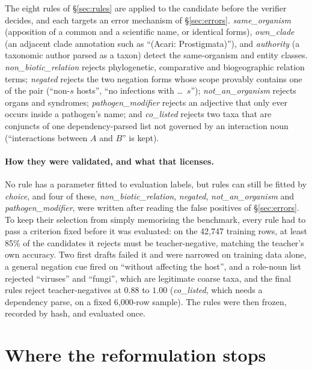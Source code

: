 \documentclass[11pt]{article}
\begin{document}
The eight rules of \S\ref{sec:rules} are applied to the candidate before the verifier decides,
and each targets an error mechanism of \S\ref{sec:errors}. \emph{same\_organism}
(apposition of a common and a scientific name, or identical forms), \emph{own\_clade} (an adjacent
clade annotation such as ``(Acari: Prostigmata)''), and \emph{authority} (a taxonomic author parsed
as a taxon) detect the same-organism and entity classes. \emph{non\_biotic\_relation} rejects
phylogenetic, comparative and biogeographic relation terms; \emph{negated} rejects the two
negation forms whose scope provably contains one of the pair (``non-$s$ hosts'', ``no infections
with \ldots\ $s$''); \emph{not\_an\_organism} rejects organs and syndromes; \emph{pathogen\_modifier}
rejects an adjective that only ever occurs inside a pathogen's name; and \emph{co\_listed} rejects
two taxa that are conjuncts of one dependency-parsed list not governed by an interaction noun
(``interactions between $A$ and $B$'' is kept).

\paragraph{How they were validated, and what that licenses.}
No rule has a parameter fitted to evaluation labels, but rules can still be fitted by \emph{choice},
and four of these, \emph{non\_biotic\_relation}, \emph{negated}, \emph{not\_an\_organism} and
\emph{pathogen\_modifier}, were written after reading the false positives of \S\ref{sec:errors}. To keep their
selection from simply memorising the benchmark, every rule had to pass a criterion fixed before it
was evaluated: on the 42{,}747 training rows, at least 85\% of the candidates it rejects must be
teacher-negative, matching the teacher's own accuracy. Two first drafts failed it and were narrowed
on training data alone, a general negation cue fired on ``without affecting the host'', and a
role-noun list rejected ``viruses'' and ``fungi'', which are legitimate coarse taxa, and the
final rules reject teacher-negatives at $0.88$ to $1.00$ (\emph{co\_listed}, which needs a dependency
parse, on a fixed 6{,}000-row sample). The rules were then frozen, recorded by hash, and evaluated
once.

\section{Where the reformulation stops}
\label{sec:notfixed}
\end{document}
